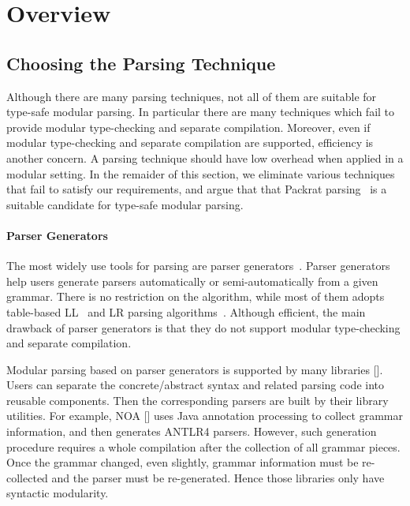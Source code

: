 \section{Overview}\label{sec:overview}

\subsection{Choosing the Parsing Technique}\label{subsec:overview-parsing}


Although there are many parsing techniques, not all of them are
suitable for type-safe modular parsing. In particular there are many
techniques which fail to provide modular type-checking and separate
compilation. Moreover, even if modular type-checking and separate
compilation are supported, efficiency is another
concern. A parsing technique should have low overhead when applied
in a modular setting. In the remaider of this section, we eliminate
various techniques that fail to satisfy our requirements, and argue
that that Packrat parsing~\cite{} is a suitable candidate for
type-safe modular parsing.

\paragraph{Parser Generators} The most widely use tools for parsing
are parser generators~\cite{}. Parser generators help users generate parsers automatically or
semi-automatically from a given grammar. There is no restriction on
the algorithm, while most of them adopts table-based LL~\cite{} and LR parsing
algorithms~\cite{}.
Although efficient, the main drawback of parser generators is that they do not support
modular type-checking and separate compilation.

Modular parsing based on parser generators is supported by many libraries []. Users can separate the concrete/abstract syntax and related parsing code into reusable components. Then the corresponding parsers are built by their library utilities. For example, NOA [] uses Java annotation processing to collect grammar information, and then generates ANTLR4 parsers. However, such generation procedure requires a whole compilation after the collection of all grammar pieces. Once the grammar changed, even slightly, grammar information must be re-collected and the parser must be re-generated. Hence those libraries only have syntactic modularity.

